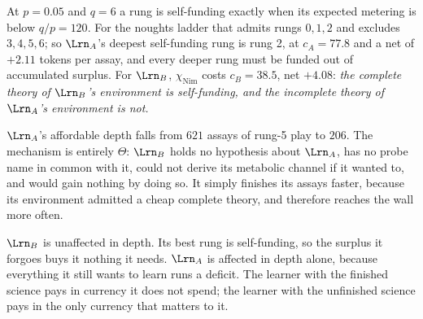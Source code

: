 At $p = 0.05$ and $q = 6$ a rung is self-funding exactly when its expected metering is below
$q/p = 120$. For the noughts ladder that admits rungs $0,1,2$ and excludes $3,4,5,6$; so
$\Lrn_A$'s deepest self-funding rung is rung 2, at $c_A = 77.8$ and a net of $+2.11$ tokens per
assay, and every deeper rung must be funded out of accumulated surplus. For $\Lrn_B$, $\chi_{\mathrm{Nim}}$
costs $c_B = 38.5$, net $+4.08$: \emph{the complete theory of $\Lrn_B$'s environment is
self-funding, and the incomplete theory of $\Lrn_A$'s environment is not.}

\begin{table}[t]
\centering
\small
{}
\caption{The composite, exactly. $\Lrn_A$ retains $0.331$ of the deep inquiry it could afford
alone---identically its share of the wall, per Proposition~\ref{com:prop:dilution}---and loses
$66.9\%$. $\Lrn_B$ loses $33.1\%$ of its assays and none of its depth, because the rung it holds
is self-funding. Neither learner perceives, models, or touches the other.}
\label{com:tab:composite}
\end{table}

\begin{observation}\label{com:measurement}
$\Lrn_A$'s affordable depth falls from $621$ assays of rung-5 play to $206$. The mechanism is
entirely $\Theta$: $\Lrn_B$ holds no hypothesis about $\Lrn_A$, has no probe name in common with
it, could not derive its metabolic channel if it wanted to, and would gain nothing by doing so.
It simply finishes its assays faster, because its environment admitted a cheap complete theory,
and therefore reaches the wall more often.
\end{observation}

\begin{observation}\label{com:regressive}
$\Lrn_B$ is unaffected in depth. Its best rung is self-funding, so the surplus it forgoes buys it
nothing it needs. $\Lrn_A$ is affected in depth alone, because everything it still wants to learn
runs a deficit. The learner with the finished science pays in currency it does not spend; the
learner with the unfinished science pays in the only currency that matters to it.
\end{observation}

